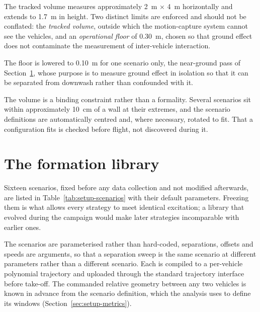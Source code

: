 The tracked volume measures approximately \SI{2}{\metre} $\times$ \SI{4}{\metre} horizontally and
extends to \SI{1.7}{\metre} in height. Two distinct limits are enforced and should not be
conflated: the \emph{tracked volume}, outside which the motion-capture system cannot see the
vehicles, and an \emph{operational floor} of \SI{0.30}{\metre}, chosen so that ground effect does
not contaminate the measurement of inter-vehicle interaction.

The floor is lowered to \SI{0.10}{\metre} for one scenario only, the near-ground pass of
Section~\ref{sec:setup-scenarios}, whose purpose is to measure ground effect in isolation so that
it can be separated from downwash rather than confounded with it.

The volume is a binding constraint rather than a formality. Several scenarios sit within
approximately \SI{10}{\centi\metre} of a wall at their extremes, and the scenario definitions are
automatically centred and, where necessary, rotated to fit. That a configuration fits is checked
before flight, not discovered during it.


\section{The formation library}
\label{sec:setup-scenarios}

Sixteen scenarios, fixed before any data collection and not modified afterwards, are listed in
Table~\ref{tab:setup-scenarios} with their default parameters. Freezing them is
what allows every strategy to meet identical excitation; a library that evolved during the campaign
would make later strategies incomparable with earlier ones.

The scenarios are parameterised rather than hard-coded, separations, offsets and speeds are
arguments, so that a separation sweep is the same scenario at different parameters rather than
a different scenario. Each is compiled to a per-vehicle polynomial trajectory and uploaded through
the standard trajectory interface before take-off. The commanded relative geometry between any two vehicles is known in advance from
the scenario definition, which the analysis uses to define its windows
(Section~\ref{sec:setup-metrics}).

